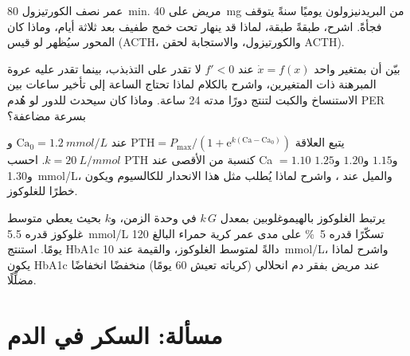 \begin{exercise}[$\star\star$]\label{exo:b3:endocrinology:9}
عمر نصف الكورتيزول \qty{80}{min}. مريض على \qty{40}{mg} من
البريدنيزولون يوميًا سنةً يتوقف فجأةً. اشرح، طبقةً طبقة،
لماذا قد ينهار تحت خمج طفيف بعد ثلاثة أيام، وماذا كان
المحور سيُظهر لو قيس (ACTH، والكورتيزول، والاستجابة لحقن
ACTH).
\end{exercise}

\begin{exercise}[$\star\star\star$]\label{exo:b3:endocrinology:10}
بيّن أن  بمتغير واحد $\dot x = f(x)$ عند
$f' < 0$ لا تقدر على التذبذب، بينما تقدر عليه عروة المبرهنة
ذات المتغيرين، واشرح بالكلام لماذا تحتاج الساعة إلى تأخير
ساعات بين الاستنساخ والكبت لتنتج دورًا مدته 24 ساعة. وماذا
كان سيحدث للدور لو هُدم PER بسرعة مضاعفة؟
\end{exercise}

\begin{exercise}[$\star\star\star$]\label{exo:b3:endocrinology:11}
يتبع  العلاقة $\text{PTH} = P_{\max}/(1 +
\mathrm{e}^{k(\text{Ca} - \text{Ca}_{0})})$ عند $\text{Ca}_{0} =
\qty{1.2}{mmol/L}$ و$k = \qty{20}{L/mmol}$. احسب PTH كنسبة من
الأقصى عند Ca $= 1.10$ و$1.15$ و$1.20$ و$1.25$ و\qty{1.30}{mmol/L}،
والميل عند ، واشرح لماذا يُطلب مثل هذا الانحدار
للكالسيوم ويكون خطرًا للغلوكوز.
\end{exercise}

\begin{exercise}[$\star\star\star$]\label{exo:b3:endocrinology:12}
يرتبط الغلوكوز بالهيموغلوبين بمعدل $k\,G$ في وحدة الزمن،
و$k$ بحيث يعطي متوسط غلوكوز قدره \qty{5.5}{mmol/L} تسكّرًا
قدره \qty{5}{\%} على مدى عمر كرية حمراء البالغ 120 يومًا.
استنتج HbA1c دالةً لمتوسط الغلوكوز، والقيمة عند
\qty{10}{mmol/L}، واشرح لماذا يكون HbA1c عند مريض بفقر دم
انحلالي (كرياته تعيش 60 يومًا) منخفضًا انخفاضًا مضلِّلًا.
\end{exercise}

\section{مسألة: السكر في الدم}

